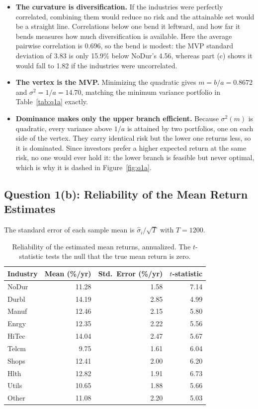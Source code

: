 \documentclass[11pt]{article}
\begin{document}
\begin{itemize}
\setlength{\itemsep}{6pt}\setlength{\parskip}{0pt}

\item \textbf{The curvature is diversification.} If the industries were
perfectly correlated, combining them would reduce no risk and the attainable
set would be a straight line. Correlations below one bend it leftward, and how
far it bends measures how much diversification is available. Here the average
pairwise correlation is 0.696, so the bend is modest: the MVP standard
deviation of 3.83 is only 15.9\% below NoDur's 4.56, whereas part (c) shows it
would fall to 1.82 if the industries were uncorrelated.

\item \textbf{The vertex is the MVP.} Minimizing the quadratic gives
$m = b/a = 0.8672$ and $\sigma^2 = 1/a = 14.70$, matching the minimum variance
portfolio in Table~\ref{tab:q1a} exactly.

\item \textbf{Dominance makes only the upper branch efficient.} Because
$\sigma^2(m)$ is quadratic, every variance above $1/a$ is attained by two
portfolios, one on each side of the vertex. They carry identical risk but the
lower one returns less, so it is dominated. Since investors prefer a higher
expected return at the same risk, no one would ever hold it: the lower branch
is feasible but never optimal, which is why it is dashed in
Figure~\ref{fig:q1a}.

\end{itemize}

\subsection{Question 1(b): Reliability of the Mean Return Estimates}

The standard error of each sample mean is $\hat\sigma_i/\sqrt{T}$ with
$T = 1200$.

\begin{table}[H]
\centering
\caption{Reliability of the estimated mean returns, annualized. The
$t$-statistic tests the null that the true mean return is zero.}
\begin{tabular}{lrrr}
\toprule
Industry & Mean (\%/yr) & Std.\ Error (\%/yr) & $t$-statistic \\
\midrule
NoDur & 11.28 & 1.58 & 7.14 \\
Durbl & 14.19 & 2.85 & 4.99 \\
Manuf & 12.46 & 2.15 & 5.80 \\
Enrgy & 12.35 & 2.22 & 5.56 \\
HiTec & 14.04 & 2.47 & 5.67 \\
Telcm & 9.75 & 1.61 & 6.04 \\
Shops & 12.41 & 2.00 & 6.20 \\
Hlth & 12.82 & 1.91 & 6.73 \\
Utils & 10.65 & 1.88 & 5.66 \\
Other & 11.08 & 2.20 & 5.03 \\
\bottomrule
\end{tabular}
\label{tab:q1b_rel}
\end{table}
\end{document}
